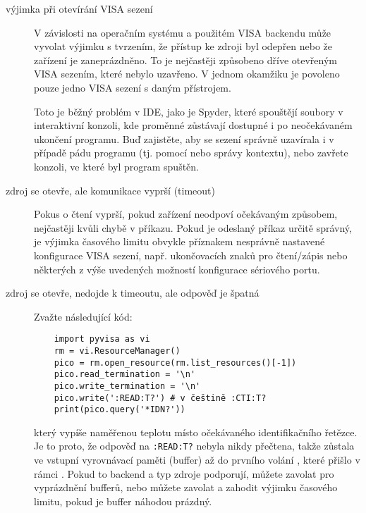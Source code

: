 \begin{description}
    \item[výjimka při otevírání VISA sezení] V závislosti na operačním systému a použitém VISA backendu může  vyvolat výjimku s tvrzením, že přístup ke zdroji byl odepřen nebo že zařízení je zaneprázdněno. To je nejčastěji způsobeno dříve otevřeným VISA sezením, které nebylo uzavřeno. V jednom okamžiku je povoleno pouze jedno VISA sezení s daným přístrojem.
    
    Toto je běžný problém v IDE, jako je Spyder, které spouštějí soubory v interaktivní konzoli, kde proměnné zůstávají dostupné i po neočekávaném ukončení programu. Buď zajistěte, aby se sezení správně uzavírala i v případě pádu programu (tj. pomocí  nebo správy kontextu), nebo zavřete konzoli, ve které byl program spuštěn.

    \item[zdroj se otevře, ale komunikace vyprší (timeout)] Pokus o čtení vyprší, pokud zařízení neodpoví očekávaným způsobem, nejčastěji kvůli chybě v příkazu. Pokud je odeslaný příkaz určitě správný, je výjimka časového limitu obvykle příznakem nesprávně nastavené konfigurace VISA sezení, např. ukončovacích znaků pro čtení/zápis nebo některých z výše uvedených možností konfigurace sériového portu.
    
    \item[zdroj se otevře, nedojde k timeoutu, ale odpověď je špatná] Zvažte následující kód:
\begin{lstlisting}
    import pyvisa as vi
    rm = vi.ResourceManager()
    pico = rm.open_resource(rm.list_resources()[-1])    
    pico.read_termination = '\n'
    pico.write_termination = '\n'
    pico.write(':READ:T?') # v češtině :CTI:T?
    print(pico.query('*IDN?'))
\end{lstlisting}
    který vypíše naměřenou teplotu místo očekávaného identifikačního řetězce. Je to proto, že odpověď na \verb|:READ:T?| nebyla nikdy přečtena, takže zůstala ve vstupní vyrovnávací paměti (buffer) až do prvního volání , které přišlo v rámci . Pokud to backend a typ zdroje podporují, můžete zavolat  pro vyprázdnění bufferů, nebo můžete zavolat  a zahodit výjimku časového limitu, pokud je buffer náhodou prázdný.
\end{description}